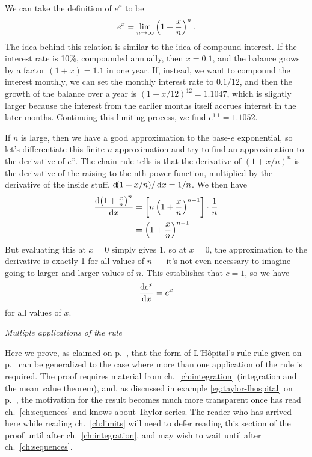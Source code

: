 We can take the definition of $e^x$ to be\label{definition-of-exp}
\begin{align*}
  e^x = \lim_{n\rightarrow \infty} \left(1+\frac{x}{n}\right)^n.
\end{align*}
The idea behind this relation is similar to the idea of compound interest. If the interest rate is 10\%, compounded
annually, then $x=0.1$, and the balance grows by a factor $(1+x)=1.1$ in one year. If, instead, we want to compound the
interest monthly, we can set the monthly interest rate to $0.1/12$, and then the growth of the
balance over a year is $(1+x/12)^{12}=1.1047$, which is slightly larger because the interest from the earlier months
itself accrues interest in the later months. Continuing this limiting process, we find $e^{1.1}=1.1052$.

If $n$ is large, then we have a good approximation to the base-$e$ exponential, so let's differentiate
this finite-$n$ approximation and try to find an approximation to the derivative of $e^x$. The chain rule
tells is that the derivative of $(1+x/n)^n$ is the derivative of the raising-to-the-nth-power function,
multiplied by the derivative of the inside stuff, $\operatorname{d\!}(1+x/n)/\operatorname{d\!} x=1/n$. We then have
\begin{align*}
  \frac{\operatorname{d\!} \left(1+\frac{x}{n}\right)^n}{\operatorname{d\!} x} &= \left[n\left(1+\frac{x}{n}\right)^{n-1}\right]\cdot \frac{1}{n} \\
            &= \left(1+\frac{x}{n}\right)^{n-1}.
\end{align*}
But evaluating this at $x=0$ simply gives 1, so at $x=0$, the approximation to the derivative is exactly 1 for all values of
$n$ --- it's not even necessary to imagine going to larger and larger values of $n$. This establishes that $c=1$,
so we have
\begin{equation*}
  \frac{\operatorname{d\!} e^x}{\operatorname{d\!} x} = e^x 
\end{equation*}
for all values of $x$.

\emph{Multiple applications of the rule}

Here we prove, as claimed on p.~\pageref{lhospital-multiple}, that the form of L'H\^{o}pital's rule rule given
on p.~\pageref{lhospital-simple} can be generalized to the case where more than one application of the
rule is required. The proof requires material from ch.~\ref{ch:integration} (integration and the mean value theorem),
and, as discussed in example \ref{eg:taylor-lhospital} on p.~\pageref{eg:taylor-lhospital}, 
the motivation for the result becomes much more transparent once has read ch.~\ref{ch:sequences} and knows
about Taylor series. The reader who has arrived here while reading ch.~\ref{ch:limits} will need to defer reading
this section of the proof until after ch.~\ref{ch:integration}, and may wish to wait until after ch.~\ref{ch:sequences}.

